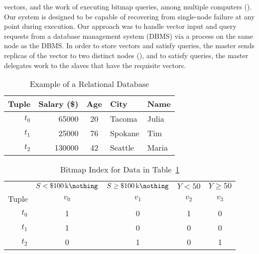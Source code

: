 vectors, and the work of executing bitmap queries, among multiple computers
(). Our system is designed to be capable of recovering from
single-node failure at any point during execution. Our approach was to handle
vector input and query requests from a database management system (DBMS) via a
 process on the same node as the DBMS. In order to store vectors
and satisfy queries, the master sends replicas of the vector to two distinct
nodes (), and to satisfy queries, the master delegates work to
the slaves that have the requisite vectors.
\par
%
\begin{table}[H]
    \centering
    \caption{Example of a Relational Database}
    \label{table:census-relational}
    \begin{tabular}{@{}r||rcll@{}}
        \toprule
        Tuple   & Salary (\$)  & Age & City    & Name  \\
        \midrule
        \(t_0\) & \num{65000}  & 20  & Tacoma  & Julia \\
        \(t_1\) & \num{25000}  & 76  & Spokane & Tim   \\
        \(t_2\) & \num{130000} & 42  & Seattle & Maria \\
        \bottomrule
    \end{tabular}
\end{table}
%
\begin{table}[H]
    \centering
    \caption{Bitmap Index for Data in Table~\ref{table:census-relational}}
    \label{table:census-bitmap}
    \begin{tabular}{@{}r||cc|cc@{}}
        \toprule
                & \(S < \SI{100}[\$]{\kilo\nothing}\)
                & \(S \geq \SI{100}[\$]{\kilo\nothing}\)
                & \(Y < 50\) & \(Y \geq 50\) \\
        Tuple   & \(v_0\)    & \(v_1\)       & \(v_2\)    & \(v_3\)       \\
        \midrule
        \(t_0\) & 1          & 0             & 1          & 0             \\
        \(t_1\) & 1          & 0             & 0          & 0             \\
        \(t_2\) & 0          & 1             & 0          & 1             \\
        \bottomrule
    \end{tabular}
\end{table}
